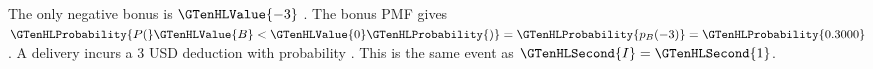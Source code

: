 The only negative bonus is $\GTenHLValue{-3}$ . The bonus PMF gives $\GTenHLProbability{P(}\GTenHLValue{B}<\GTenHLValue{0}\GTenHLProbability{)}=\GTenHLProbability{p_{B}(-3)}=\GTenHLProbability{0.3000}$. A delivery incurs a 3 USD deduction with probability . This is the same event as $\GTenHLSecond{I}=\GTenHLSecond{1}$.



